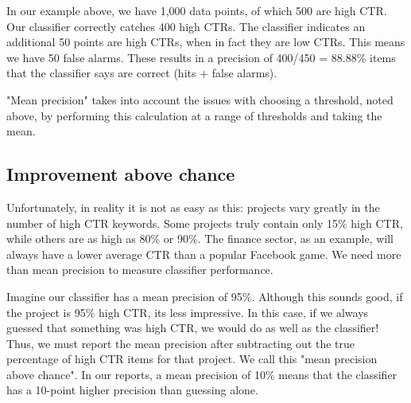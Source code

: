 
In our example above, we have 1,000 data points, of which 500 are high CTR. Our classifier correctly catches 400 high CTRs. The classifier indicates an additional 50 points are high CTRs, when in fact they are low CTRs. This means we have 50 false alarms. These results in a precision of 400/450 = 88.88\% items that the classifier says are correct (hits + false alarms).


"Mean precision" takes into account the issues with choosing a threshold, noted above, by performing this calculation at a range of thresholds and taking the mean.

\subsection*{Improvement above chance}
Unfortunately, in reality it is not as easy as this: projects vary greatly in the number of high CTR keywords. Some projects truly contain only 15\% high CTR,
 while others are as high as 80\% or 90\%. The finance sector, as an example, will always have a lower average CTR than a popular Facebook game.  We need more than mean precision to measure classifier performance.

Imagine our classifier has a mean precision of 95\%. Although this sounds good, if the project is 95\% high CTR, it\textsc{}s less impressive. In this case, if we always guessed that something was high CTR, we would do as well as the classifier! Thus, we must report the mean precision after subtracting out the true percentage of high CTR items for that project. We call this "mean precision above chance". In our reports, a mean precision of 10\% means that the classifier has a 10-point higher precision than guessing alone.



